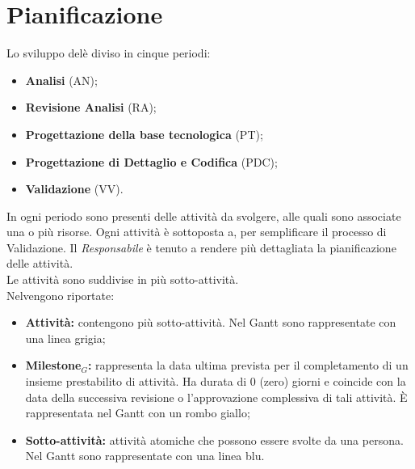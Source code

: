 \chapter{Pianificazione}\label{Pianificazione} 
Lo sviluppo delè diviso in cinque periodi:
\begin{itemize}
    \item \textbf{Analisi} (AN);
    \item \textbf{Revisione Analisi} (RA);
    \item \textbf{Progettazione della base tecnologica} (PT);
    \item \textbf{Progettazione di Dettaglio e Codifica} (PDC);
    \item \textbf{Validazione} (VV).
\end{itemize}
In ogni periodo sono presenti delle attività da svolgere, alle quali sono associate una o più risorse. Ogni attività è sottoposta a, per semplificare il processo di Validazione. Il \textit{Responsabile} è tenuto a rendere più dettagliata la pianificazione delle attività.\\
Le attività sono suddivise in più sotto-attività.\\
Nelvengono riportate:
\begin{itemize}
    \item \textbf{Attività:} contengono più sotto-attività. Nel Gantt sono rappresentate con una linea grigia;
    \item \textbf{Milestone$_{G}$:} rappresenta la data ultima prevista per il completamento di un insieme prestabilito di attività. Ha durata di 0 (zero) giorni e coincide con la data della successiva revisione o l'approvazione complessiva di tali attività. È rappresentata nel Gantt con un rombo giallo;
    \item \textbf{Sotto-attività:} attività atomiche che possono essere svolte da una persona. Nel Gantt sono rappresentate con una linea blu.  
\end{itemize}
